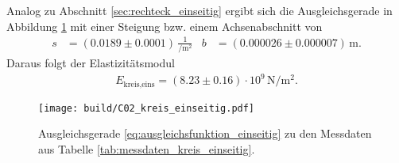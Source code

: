 \noindent
Analog zu Abschnitt \ref{sec:rechteck_einseitig} ergibt sich die Ausgleichsgerade in Abbildung \ref{fig:plot_kreis_einseitig}
mit einer Steigung bzw. einem Achsenabschnitt von 
\begin{align*}
    s &= (\num{0.0189} \pm \num{0.0001}) \, \frac{1}{\unit{\per\meter^2}} & b &= (\num{0.000026} \pm \num{0.000007}) \, \unit{\meter}.
\end{align*}
Daraus folgt der Elastizitätsmodul
\begin{align}
    E_\text{kreis,eins} = (\num{8.23} \pm \num{0.16}) \cdot 10^9 \, \unit{\newton\per\meter^2}.
\end{align}

\begin{figure}[H]
    \centering
    \texttt{[image: build/C02\_kreis\_einseitig.pdf]}
    \caption{Ausgleichsgerade \eqref{eq:ausgleichsfunktion_einseitig} zu den Messdaten aus Tabelle \ref{tab:messdaten_kreis_einseitig}.}
    \label{fig:plot_kreis_einseitig}
\end{figure}